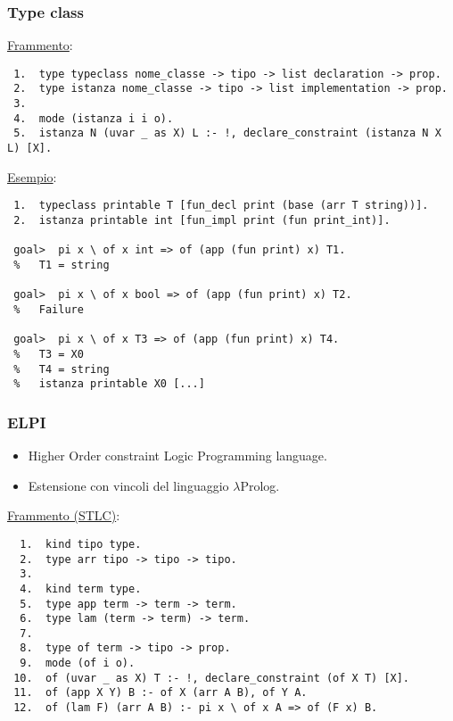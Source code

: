 \documentclass{beamer}
\begin{document}
\begin{frame}[fragile=singleslide]      %
 
 \frametitle{Type class}

 \underline{Frammento}:
 \begin{verbatim}
 1.  type typeclass nome_classe -> tipo -> list declaration -> prop.
 2.  type istanza nome_classe -> tipo -> list implementation -> prop.
 3.
 4.  mode (istanza i i o).
 5.  istanza N (uvar _ as X) L :- !, declare_constraint (istanza N X L) [X].
 \end{verbatim}

 \vfill

 \underline{Esempio}:
 \begin{verbatim}
 1.  typeclass printable T [fun_decl print (base (arr T string))].
 2.  istanza printable int [fun_impl print (fun print_int)].

 goal>  pi x \ of x int => of (app (fun print) x) T1.
 %   T1 = string

 goal>  pi x \ of x bool => of (app (fun print) x) T2.
 %   Failure

 goal>  pi x \ of x T3 => of (app (fun print) x) T4.
 %   T3 = X0
 %   T4 = string
 %   istanza printable X0 [...]
 \end{verbatim}

\end{frame}


\begin{frame}[fragile=singleslide]      %

 \frametitle{ELPI}

 \begin{itemize}
  \item Higher Order constraint Logic Programming language.
  \item Estensione con vincoli del linguaggio $\lambda$Prolog.
 \end{itemize}

 \vfill
 
 \underline{Frammento (STLC)}:
 \begin{verbatim}
  1.  kind tipo type.
  2.  type arr tipo -> tipo -> tipo.
  3.
  4.  kind term type.
  5.  type app term -> term -> term.
  6.  type lam (term -> term) -> term.
  7.
  8.  type of term -> tipo -> prop.
  9.  mode (of i o).
 10.  of (uvar _ as X) T :- !, declare_constraint (of X T) [X].
 11.  of (app X Y) B :- of X (arr A B), of Y A.
 12.  of (lam F) (arr A B) :- pi x \ of x A => of (F x) B.
 \end{verbatim}

\end{frame}
\end{document}

